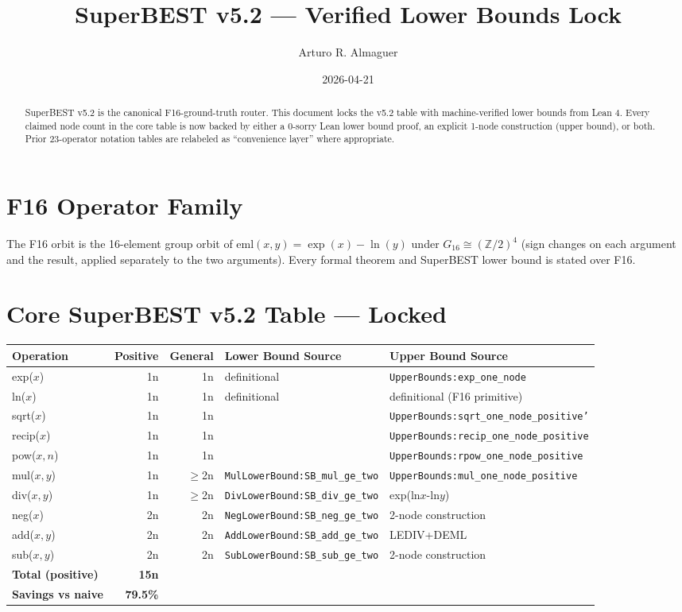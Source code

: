 \documentclass[11pt]{article}
\title{SuperBEST v5.2 — Verified Lower Bounds Lock}
\author{Arturo R. Almaguer}
\date{2026-04-21}
\newcommand{\lv}[1]{\textcolor{lean}{\texttt{#1}}}
\begin{document}
\maketitle

\begin{abstract}
SuperBEST v5.2 is the canonical F16-ground-truth router. This document locks the
v5.2 table with machine-verified lower bounds from Lean 4. Every claimed node count
in the core table is now backed by either a 0-sorry Lean lower bound proof, an explicit
1-node construction (upper bound), or both. Prior 23-operator notation tables are
relabeled as ``convenience layer'' where appropriate.
\end{abstract}

\section{F16 Operator Family}

The F16 orbit is the 16-element group orbit of $\text{eml}(x,y) = \exp(x) - \ln(y)$
under $G_{16} \cong (\mathbb{Z}/2)^4$ (sign changes on each argument and the result,
applied separately to the two arguments). Every formal theorem and SuperBEST lower
bound is stated over F16.

\section{Core SuperBEST v5.2 Table — Locked}

\begin{center}
\begin{tabular}{lrrll}
\toprule
Operation & Positive & General & Lower Bound Source & Upper Bound Source \\
\midrule
exp($x$)     & 1n & 1n & definitional & \lv{UpperBounds:exp\_one\_node} \\
ln($x$)      & 1n & 1n & definitional & definitional (F16 primitive) \\
sqrt($x$)    & 1n & 1n & & \lv{UpperBounds:sqrt\_one\_node\_positive'} \\
recip($x$)   & 1n & 1n & & \lv{UpperBounds:recip\_one\_node\_positive} \\
pow($x,n$)   & 1n & 1n & & \lv{UpperBounds:rpow\_one\_node\_positive} \\
mul($x,y$)   & 1n & $\geq$2n & \lv{MulLowerBound:SB\_mul\_ge\_two} & \lv{UpperBounds:mul\_one\_node\_positive} \\
div($x,y$)   & 1n & $\geq$2n & \lv{DivLowerBound:SB\_div\_ge\_two} & exp(ln$x$-ln$y$) \\
neg($x$)     & 2n & 2n & \lv{NegLowerBound:SB\_neg\_ge\_two} & 2-node construction \\
add($x,y$)   & 2n & 2n & \lv{AddLowerBound:SB\_add\_ge\_two} & LEDIV+DEML \\
sub($x,y$)   & 2n & 2n & \lv{SubLowerBound:SB\_sub\_ge\_two} & 2-node construction \\
\midrule
\textbf{Total (positive)} & \textbf{15n} & & & \\
\textbf{Savings vs naive} & \textbf{79.5\%} & & & \\
\bottomrule
\end{tabular}
\end{center}
\end{document}
